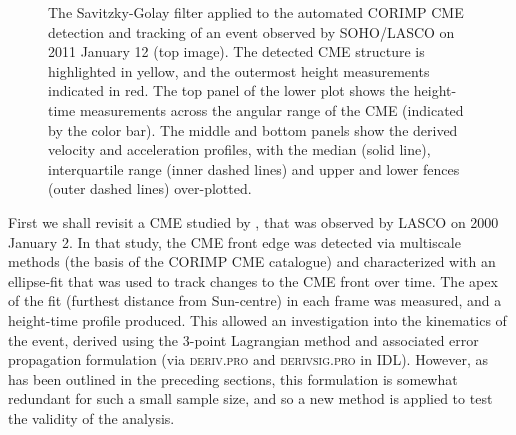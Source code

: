 \documentclass[structabstract]{aa}
\begin{document}
\begin{figure}[!t]
\centering
{}
\caption{The Savitzky-Golay filter applied to the automated CORIMP CME detection and tracking of an event observed by SOHO/LASCO on 2011 January 12 (top image). The detected CME structure is highlighted in yellow, and the outermost height measurements indicated in red. The top panel of the lower plot shows the height-time measurements across the angular range of the CME (indicated by the color bar). The middle and bottom panels show the derived velocity and acceleration profiles, with the median (solid line), interquartile range (inner dashed lines) and upper and lower fences (outer dashed lines) over-plotted.}
\label{fig_savgol_CME_CORIMP}
\end{figure}

First we shall revisit a CME studied by \citet{2009A&A...495..325B}, that was observed by LASCO on 2000 January 2. In that study, the CME front edge was detected via multiscale methods (the basis of the CORIMP CME catalogue) and characterized with an ellipse-fit that was used to track changes to the CME front over time. The apex of the fit (furthest distance from Sun-centre) in each frame was measured, and a height-time profile produced. This allowed an investigation into the kinematics of the event, derived using the 3-point Lagrangian method and associated error propagation formulation (via \textsc{deriv.pro} and \textsc{derivsig.pro} in IDL). However, as has been outlined in the preceding sections, this formulation is somewhat redundant for such a small sample size, and so a new method is applied to test the validity of the analysis.
\end{document}
